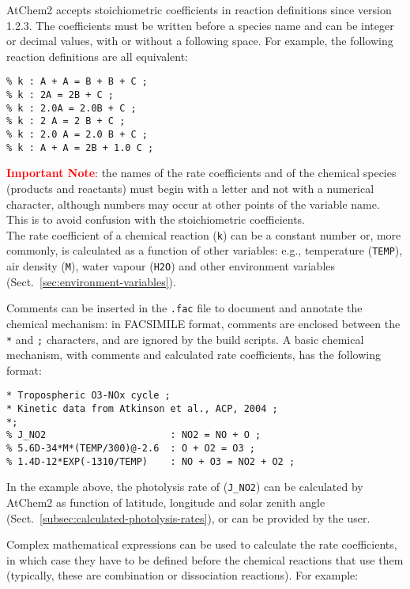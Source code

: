 AtChem2 accepts stoichiometric coefficients in reaction definitions
since version 1.2.3. The coefficients must be written before a species
name and can be integer or decimal values, with or without a following
space. For example, the following reaction definitions are all
equivalent:

\begin{verbatim}
% k : A + A = B + B + C ;
% k : 2A = 2B + C ;
% k : 2.0A = 2.0B + C ;
% k : 2 A = 2 B + C ;
% k : 2.0 A = 2.0 B + C ;
% k : A + A = 2B + 1.0 C ;
\end{verbatim}

\textcolor{red}{\bf Important Note}: the names of the rate
coefficients and of the chemical species (products and reactants) must
begin with a letter and not with a numerical character, although
numbers may occur at other points of the variable name. This is to
avoid confusion with the stoichiometric coefficients.\\

The rate coefficient of a chemical reaction (\texttt{k}) can be a
constant number or, more commonly, is calculated as a function of
other variables: e.g., temperature (\texttt{TEMP}), air density
(\texttt{M}), water vapour (\texttt{H2O}) and other environment
variables (Sect.~\ref{sec:environment-variables}).

Comments can be inserted in the \texttt{.fac} file to document and
annotate the chemical mechanism: in FACSIMILE format, comments are
enclosed between the \texttt{*} and \texttt{;} characters, and are
ignored by the build scripts. A basic chemical mechanism, with
comments and calculated rate coefficients, has the following format:

\begin{verbatim}
* Tropospheric O3-NOx cycle ;
* Kinetic data from Atkinson et al., ACP, 2004 ;
*;
% J_NO2                      : NO2 = NO + O ;
% 5.6D-34*M*(TEMP/300)@-2.6  : O + O2 = O3 ;
% 1.4D-12*EXP(-1310/TEMP)    : NO + O3 = NO2 + O2 ;
\end{verbatim}

In the example above, the photolysis rate of  (\texttt{J\_NO2})
can be calculated by AtChem2 as function of latitude, longitude and
solar zenith angle (Sect.~\ref{subsec:calculated-photolysis-rates}),
or can be provided by the user.

Complex mathematical expressions can be used to calculate the rate
coefficients, in which case they have to be defined before the
chemical reactions that use them (typically, these are combination or
dissociation reactions). For example:

